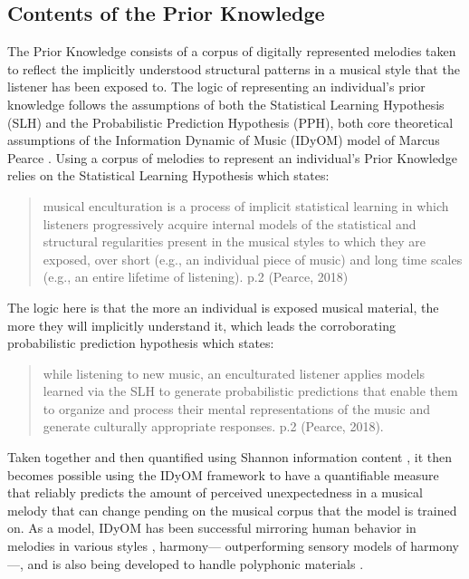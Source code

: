 \documentclass[12pt,]{book}
\begin{document}
\hypertarget{contents-of-the-prior-knowledge}{%
\subsection{Contents of the Prior Knowledge}\label{contents-of-the-prior-knowledge}}

The Prior Knowledge consists of a corpus of digitally represented melodies taken to reflect the implicitly understood structural patterns in a musical style that the listener has been exposed to.
The logic of representing an individual's prior knowledge follows the assumptions of both the Statistical Learning Hypothesis (SLH) and the Probabilistic Prediction Hypothesis (PPH), both core theoretical assumptions of the Information Dynamic of Music (IDyOM) model of Marcus Pearce \citep{pearceConstructionEvaluationStatistical2005, pearceStatisticalLearningProbabilistic2018a}.
Using a corpus of melodies to represent an individual's Prior Knowledge relies on the Statistical Learning Hypothesis which states:

\begin{quote}
musical enculturation is a process of implicit statistical learning in which listeners progressively acquire internal models of the statistical and structural regularities present in the musical styles to which they are exposed, over short (e.g., an individual piece of music) and long time scales (e.g., an entire lifetime of listening). p.2 (Pearce, 2018)
\end{quote}

The logic here is that the more an individual is exposed musical material, the more they will implicitly understand it, which leads the corroborating probabilistic prediction hypothesis which states:

\begin{quote}
while listening to new music, an enculturated listener applies models learned via the SLH to generate probabilistic predictions that enable them to organize and process their mental representations of the music and generate culturally appropriate responses. p.2 (Pearce, 2018).
\end{quote}

Taken together and then quantified using Shannon information content \citep{shannonMathematicalTheoryCommunication1948}, it then becomes possible using the IDyOM framework to have a quantifiable measure that reliably predicts the amount of perceived unexpectedness in a musical melody that can change pending on the musical corpus that the model is trained on.
As a model, IDyOM has been successful mirroring human behavior in melodies in various styles \citep{pearceStatisticalLearningProbabilistic2018a}, harmony--- outperforming \citep{harrisonDissociatingSensoryCognitive2018} sensory models of harmony \citep{bigandEmpiricalEvidenceMusical2014}---, and is also being developed to handle polyphonic materials \citep{sauvePredictionPolyphonyModelling2017}.
\end{document}
